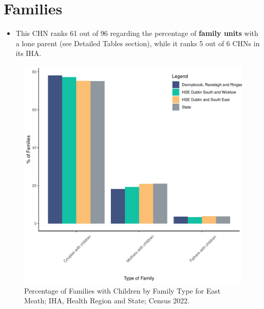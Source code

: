 \documentclass{article}
\begin{document}
\section{Families}\label{sect:Fam}
\begin{itemize}
\item This CHN ranks  61 out of 96 regarding the percentage of \textbf{family units} with a lone parent (see Detailed Tables section), while it ranks   5 out of 6 CHNs in its IHA.
\end{itemize}
\begin{figure}[H]
	\centering
	\includegraphics[width = 150mm]{../figures/FamED.pdf}
	\caption{Percentage of Families with Children by Family Type for East Meath; IHA, Health Region and State; Census 2022.}
	\label{fig:vbnv}
	\end{figure}
	
\end{document}
